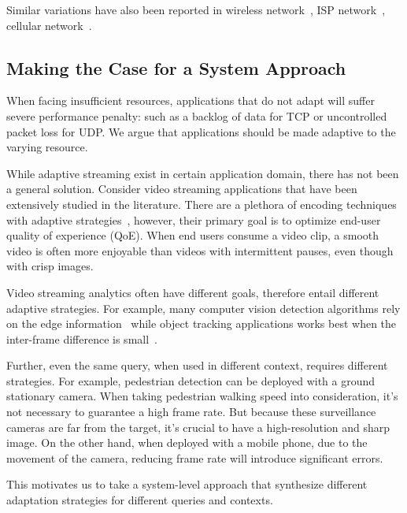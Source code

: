Similar variations have also been reported in wireless
network~\cite{biswas2015large}, ISP network~\cite{grover2013peeking}, cellular
network~\cite{nikravesh2014mobile}.


\subsection{Making the Case for a System Approach}
\label{sec:bat}

When facing insufficient resources, applications that do not adapt will suffer
severe performance penalty: such as a backlog of data for TCP or uncontrolled
packet loss for UDP. We argue that applications should be made adaptive to the
varying resource.

While adaptive streaming exist in certain application domain, there has not been
a general solution. Consider video streaming applications that have been
extensively studied in the literature. There are a plethora of encoding
techniques~\cite{richardson2011h, grange2016vp9} with adaptive
strategies~\cite{yin2015control, michalos2012dynamic, pantos2016http}, however,
their primary goal is to optimize end-user quality of experience (QoE).  When
end users consume a video clip, a smooth video is often more enjoyable than
videos with intermittent pauses, even though with crisp images.

Video streaming analytics often have different goals, therefore entail different
adaptive strategies. For example, many computer vision detection algorithms rely
on the edge information~\cite{canny1986computational, lowe2004distinctive,
  viola2001rapid} while object tracking applications works best when the
inter-frame difference is small~\cite{allen2004object}.

Further, even the same query, when used in different context, requires different
strategies. For example, pedestrian detection can be deployed with a ground
stationary camera. When taking pedestrian walking speed into consideration, it's
not necessary to guarantee a high frame rate. But because these surveillance
cameras are far from the target, it's crucial to have a high-resolution and
sharp image. On the other hand, when deployed with a mobile phone, due to the
movement of the camera, reducing frame rate will introduce significant
errors.

This motivates us to take a system-level approach that synthesize different
adaptation strategies for different queries and contexts.

\newpage

